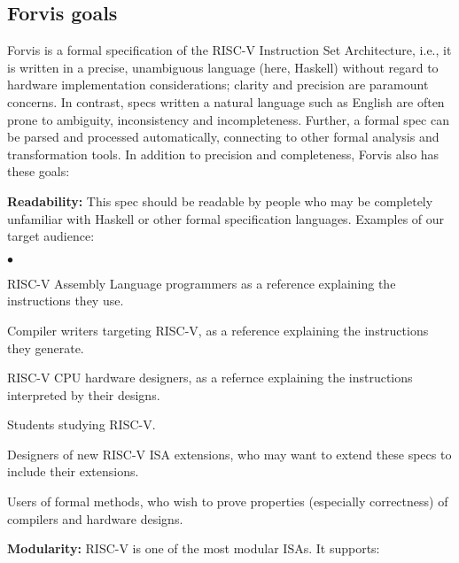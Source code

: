 \documentclass[11pt]{article}
\newenvironment{tightlist}%
{\begin{list}{$\bullet$}{%
    \setlength{\topsep}{0in}
    \setlength{\partopsep}{0in}
    \setlength{\itemsep}{0in}
    \setlength{\parsep}{0in}
    \setlength{\leftmargin}{1.5em}
    \setlength{\rightmargin}{0in}
    \setlength{\itemindent}{0in}
}
}%
{\end{list}
}
\begin{document}
\subsection{Forvis goals}

Forvis is a formal specification of the RISC-V Instruction Set
Architecture, i.e., it is written in a precise, unambiguous language
(here, Haskell) without regard to hardware implementation
considerations; clarity and precision are paramount concerns.  In
contrast, specs written a natural language such as English are often
prone to ambiguity, inconsistency and incompleteness.  Further, a
formal spec can be parsed and processed automatically, connecting to
other formal analysis and transformation tools.  In addition to
precision and completeness, Forvis also has these goals:

\begin{itemize}

\item {\bf Readability:} This spec should be readable by people who
may be completely unfamiliar with Haskell or other formal
specification languages.  Examples of our target audience:

  \begin{tightlist}
   \item RISC-V Assembly Language programmers as a reference explaining the instructions they use.

   \item Compiler writers targeting RISC-V, as a reference explaining the instructions they generate.

   \item RISC-V CPU hardware designers, as a refernce explaining the instructions interpreted by their designs.

   \item Students studying RISC-V.

   \item Designers of new RISC-V ISA extensions, who may want to
   extend these specs to include their extensions.

   \item Users of formal methods, who wish to prove properties
   (especially correctness) of compilers and hardware designs.

  \end{tightlist}

\item {\bf Modularity:} RISC-V is one of the most modular ISAs.  It
supports:


\end{itemize}
\end{document}
